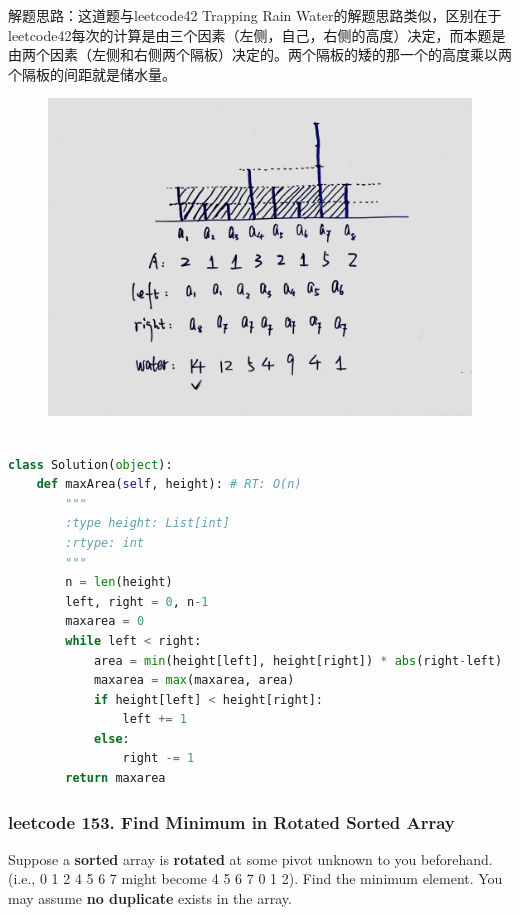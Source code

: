 \documentclass[a4paper,10pt]{article}
\begin{document}
\begin{CJK*}{UTF8}{gbsn}
\noindent 解题思路：这道题与leetcode42 Trapping Rain Water的解题思路类似，区别在于leetcode42每次的计算是由三个因素（左侧，自己，右侧的高度）决定，而本题是由两个因素（左侧和右侧两个隔板）决定的。两个隔板的矮的那一个的高度乘以两个隔板的间距就是储水量。
\end{CJK*}

\begin{figure}[h]
    \includegraphics[width=\textwidth]{leetcode11.jpg}
    \centering \\
\end{figure}

\begin{lstlisting}[language=Python, caption=Problem11. Container With Most Water]

class Solution(object):
    def maxArea(self, height): # RT: O(n)
        """
        :type height: List[int]
        :rtype: int
        """
        n = len(height)
        left, right = 0, n-1
        maxarea = 0
        while left < right:
            area = min(height[left], height[right]) * abs(right-left)
            maxarea = max(maxarea, area)
            if height[left] < height[right]:
                left += 1
            else:
                right -= 1
        return maxarea
\end{lstlisting}



\subsubsection{leetcode 153. Find Minimum in Rotated Sorted Array}
Suppose a \textbf{sorted} array is \textbf{rotated} at some pivot unknown to you beforehand. (i.e., 0 1 2 4 5 6 7 might become 4 5 6 7 0 1 2). Find the minimum element. You may assume \textbf{no duplicate} exists in the array. \\
\end{document}
